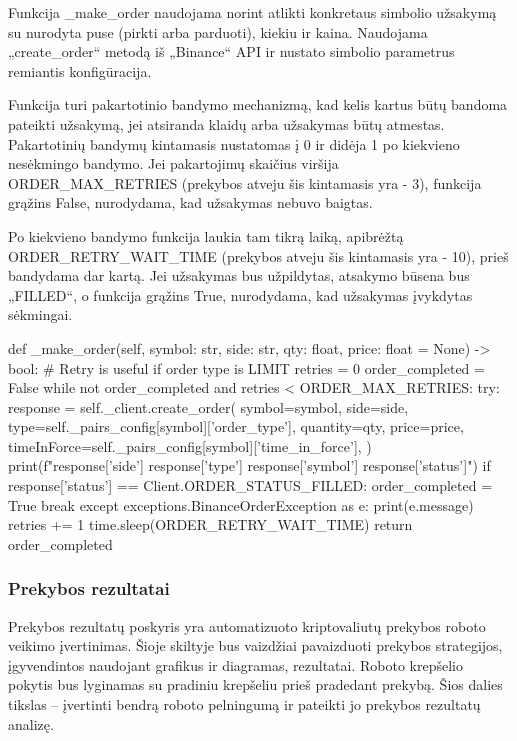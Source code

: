 \documentclass{VUMIFInfKursinis}
\begin{document}
Funkcija \_make\_order naudojama norint atlikti konkretaus simbolio užsakymą su nurodyta puse (pirkti arba parduoti), kiekiu ir kaina. Naudojama „create\_order“ metodą iš „Binance“ API ir nustato simbolio parametrus remiantis konfigūracija.

Funkcija turi pakartotinio bandymo mechanizmą, kad kelis kartus būtų bandoma pateikti užsakymą, jei atsiranda klaidų arba užsakymas būtų atmestas. Pakartotinių bandymų kintamasis nustatomas į 0 ir didėja 1 po kiekvieno nesėkmingo bandymo. Jei pakartojimų skaičius viršija ORDER\_MAX\_RETRIES (prekybos atveju šis kintamasis yra - 3), funkcija grąžins False, nurodydama, kad užsakymas nebuvo baigtas.

Po kiekvieno bandymo funkcija laukia tam tikrą laiką, apibrėžtą ORDER\_RETRY\_WAIT\_TIME (prekybos atveju šis kintamasis yra - 10), prieš bandydama dar kartą. Jei užsakymas bus užpildytas, atsakymo būsena bus „FILLED“, o funkcija grąžins True, nurodydama, kad užsakymas įvykdytas sėkmingai.

\begin{python}
def _make_order(self, symbol: str, side: str, qty: float, price: float = None) -> bool:
        # Retry is useful if order type is LIMIT
        retries = 0
        order_completed = False
        while not order_completed and retries < ORDER_MAX_RETRIES:
            try:
                response = self._client.create_order(
                    symbol=symbol,
                    side=side,
                    type=self._pairs_config[symbol]['order_type'],
                    quantity=qty,
                    price=price,
                    timeInForce=self._pairs_config[symbol]['time_in_force'],
                )
                print(f"{response['side']} {response['type']} {response['symbol']} {response['status']}")
                if response['status'] == Client.ORDER_STATUS_FILLED:
                    order_completed = True
                    break
            except exceptions.BinanceOrderException as e:
                print(e.message)
            retries += 1
            time.sleep(ORDER_RETRY_WAIT_TIME)
        return order_completed
\end{python}


\subsubsection{Prekybos rezultatai}
Prekybos rezultatų poskyris yra automatizuoto kriptovaliutų prekybos roboto veikimo įvertinimas. Šioje skiltyje bus vaizdžiai pavaizduoti prekybos strategijos, įgyvendintos naudojant grafikus ir diagramas, rezultatai. Roboto krepšelio pokytis bus lyginamas su pradiniu krepšeliu prieš pradedant prekybą. Šios dalies tikslas – įvertinti bendrą roboto pelningumą ir pateikti jo prekybos rezultatų analizę.
\end{document}
